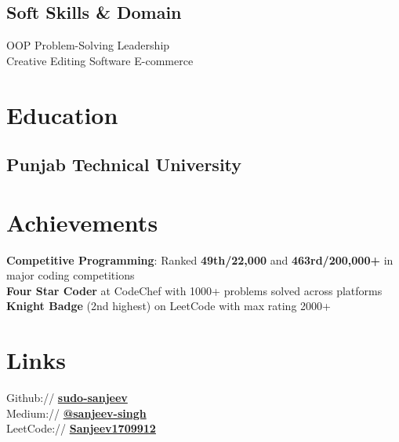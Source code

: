 \documentclass[]{deedy-resume-reversed}
\begin{document}
\begin{minipage}[t]{0.33\textwidth}
\subsection{Soft Skills \& Domain}
OOP \textbullet{} Problem-Solving \textbullet{} Leadership \\
Creative Editing Software \textbullet{} E-commerce \\
\sectionsep


\section{Education}

\subsection{Punjab Technical \newline University}
\sectionsep


\section{Achievements}
\textbf{Competitive Programming}: Ranked \textbf{49th/22,000} and \textbf{463rd/200,000+} in major coding competitions \\
\textbf{Four Star Coder} at CodeChef with 1000+ problems solved across platforms \\
\textbf{Knight Badge} (2nd highest) on LeetCode with max rating 2000+ \\
\sectionsep


\section{Links}
Github:// \href{https://github.com/sudo-sanjeev}{\bf sudo-sanjeev} \\
Medium://  \href{https://medium.com/@sanjeev-singh}{\bf @sanjeev-singh} \\
LeetCode://  \href{https://leetcode.com/u/Sanjeev1709912/}{\bf Sanjeev1709912}
\sectionsep

\end{minipage}
\end{document}
